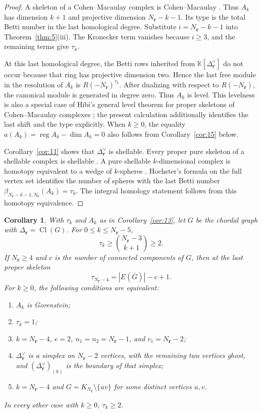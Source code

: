 \documentclass[11pt]{amsart}
\newtheorem{corollary}[theorem]{Corollary}
\theoremstyle{definition}
\theoremstyle{remark}
\newcommand{\K}{\mathbb K}
\newcommand{\SR}[1]{\K[#1]}
\DeclareMathOperator{\reg}{reg}
\begin{document}
	\begin{proof}
		A skeleton of a Cohen--Macaulay complex is Cohen--Macaulay \cite[Exercise~5.1.23]{BH98}. Thus $A_k$ has dimension $k+1$ and projective dimension $N_{\mathbf r}-k-1$. Its type is the total Betti number in the last homological degree. Substitute $i=N_{\mathbf r}-k-1$ into Theorem~\ref{thm:5}(iii). The Kronecker term vanishes because $i\ge3$, and the remaining terms give $\tau_k$.
		
		At this last homological degree, the Betti rows inherited from $\SR{\Delta_{\mathbf r}^\vee}$ do not occur because that ring has projective dimension two. Hence the last free module in the resolution of $A_k$ is $R(-N_{\mathbf r})^{\tau_k}$. After dualizing with respect to $R(-N_{\mathbf r})$, the canonical module is generated in degree zero. Thus $A_k$ is level. This levelness is also a special case of Hibi's general level theorem for proper skeletons of Cohen--Macaulay complexes \cite{HibiLevel}; the present calculation additionally identifies the last shift and the type explicitly. When $k\ge0$, the equality $a(A_k)=\reg A_k-\dim A_k=0$ also follows from Corollary~\ref{cor:15} below.
		
		Corollary~\ref{cor:11} shows that $\Delta_{\mathbf r}^\vee$ is shellable. Every proper pure skeleton of a shellable complex is shellable \cite[Lemma~1.6]{HHZ04}. A pure shellable $k$-dimensional complex is homotopy equivalent to a wedge of $k$-spheres \cite[Section~11]{Bjorner95}. Hochster's formula on the full vertex set identifies the number of spheres with the last Betti number $\beta_{N_{\mathbf r}-k-1,N_{\mathbf r}}(A_k)=\tau_k$. The integral homology statement follows from this homotopy equivalence.
		
	\end{proof}
	
	\begin{corollary}\label{cor:14}
		With $\tau_k$ and $A_k$ as in Corollary~\ref{cor:13}, let $G$ be the chordal graph with $\Delta_{\mathbf r}=\operatorname{Cl}(G)$. For $0\le k\le N_{\mathbf r}-5$,
		\[
		\tau_k\ge\binom{N_{\mathbf r}-3}{k+1}\ge2.
		\]
		If $N_{\mathbf r}\ge4$ and $c$ is the number of connected components of $G$, then at the last proper skeleton
		\[
		\tau_{N_{\mathbf r}-4}=|E(\overline G)|-c+1.
		\]
		For $k\ge0$, the following conditions are equivalent:
		\begin{enumerate}
			\item[(i)] $A_k$ is Gorenstein;
			\item[(ii)] $\tau_k=1$;
			\item[(iii)] $k=N_{\mathbf r}-4$, $e=2$, $n_1=n_2=N_{\mathbf r}-1$, and $r_1=N_{\mathbf r}-2$;
			\item[(iv)] $\Delta_{\mathbf r}^\vee$ is a simplex on $N_{\mathbf r}-2$ vertices, with the remaining two vertices ghost, and $(\Delta_{\mathbf r}^\vee)_{(k)}$ is the boundary of that simplex;
			\item[(v)] $k=N_{\mathbf r}-4$ and $G=K_{N_{\mathbf r}}\setminus\{uv\}$ for some distinct vertices $u,v$.
		\end{enumerate}
		In every other case with $k\ge0$, $\tau_k\ge2$.
	\end{corollary}
	
\end{document}
